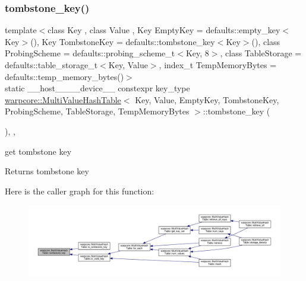 \subsubsection{\texorpdfstring{tombstone\+\_\+key()}{tombstone\_key()}}
{\footnotesize\ttfamily template$<$class Key , class Value , Key Empty\+Key = defaults\+::empty\+\_\+key$<$\+Key$>$(), Key Tombstone\+Key = defaults\+::tombstone\+\_\+key$<$\+Key$>$(), class Probing\+Scheme  = defaults\+::probing\+\_\+scheme\+\_\+t$<$\+Key, 8$>$, class Table\+Storage  = defaults\+::table\+\_\+storage\+\_\+t$<$\+Key, Value$>$, index\+\_\+t Temp\+Memory\+Bytes = defaults\+::temp\+\_\+memory\+\_\+bytes()$>$ \\
static \+\_\+\+\_\+host\+\_\+\+\_\+\+\_\+\+\_\+device\+\_\+\+\_\+ constexpr key\+\_\+type \hyperlink{classwarpcore_1_1MultiValueHashTable}{warpcore\+::\+Multi\+Value\+Hash\+Table}$<$ Key, Value, Empty\+Key, Tombstone\+Key, Probing\+Scheme, Table\+Storage, Temp\+Memory\+Bytes $>$\+::tombstone\+\_\+key (\begin{DoxyParamCaption}{ }\end{DoxyParamCaption})\hspace{0.3cm}{\ttfamily [inline]}, {\ttfamily [static]}, {\ttfamily [noexcept]}}



get tombstone key 

\begin{DoxyReturn}{Returns}
tombstone key 
\end{DoxyReturn}
Here is the caller graph for this function\+:
\nopagebreak
\begin{figure}[H]
\begin{center}
\leavevmode
\includegraphics[width=350pt]{classwarpcore_1_1MultiValueHashTable_a9eec07133f3b950b5c6465e4b8b53e78_icgraph}
\end{center}
\end{figure}
